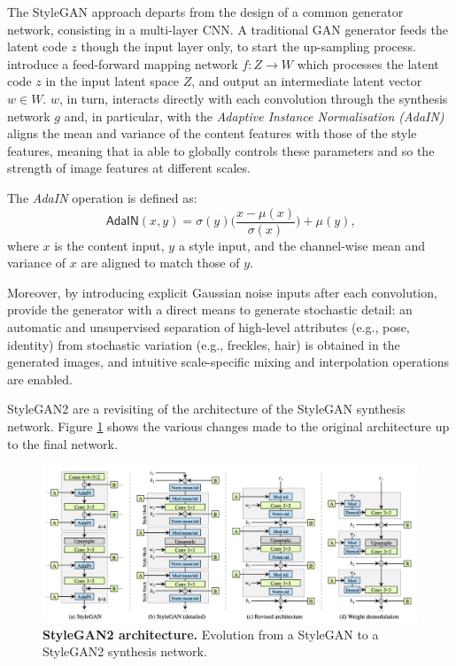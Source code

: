 \documentclass{article}
\begin{document}
	The StyleGAN approach departs from the design of a common generator network, consisting in a 
	multi-layer CNN.
	A traditional GAN generator feeds the latent code $z$ though the input layer only, to start the 
	up-sampling process.
	\citet{karras2019style} introduce a feed-forward mapping network $f : Z \rightarrow W$ which 
	processes the latent code $z$ in the input latent space $Z$, and output an intermediate latent 
	vector $w \in W$. 
	$w$, in turn, interacts directly with each convolution through the synthesis network  $g$ and, in 
	particular, with the \textit{Adaptive Instance Normalisation (AdaIN)} \cite{huang2017arbitrary} aligns 
	the mean and variance of the content features with those of the style features, meaning that ia able 
	to globally controls these parameters and so the strength of image features at different scales. 
	
	The \textit{AdaIN} operation is defined as:
	\begin{equation}
		\label{e:adain}
		\mathsf{AdaIN}(x, y) = \sigma(y) \bigg(\frac{x - \mu(x)}{\sigma (x)} \bigg) + \mu (y) \mbox{,}
	\end{equation}
	where $x$ is the content input, $y$ a style input, and the channel-wise mean and variance of $x$ 
	are aligned to match those of $y$.
	
	Moreover, by introducing explicit Gaussian noise inputs after each convolution, 
	\citet{karras2019style} provide the generator with a direct means to generate stochastic detail: an 
	automatic and unsupervised separation of high-level attributes (e.g., pose, identity) from stochastic 
	variation (e.g., freckles, hair) is obtained in the generated images, and intuitive scale-specific mixing 
	and interpolation operations are enabled.
	
	StyleGAN2 \cite{karras2020analyzing} are a revisiting of the architecture of the StyleGAN synthesis 
	network. Figure \ref{fig:styleGAN2} shows the various changes made to the original architecture up 
	to the final network.
	\begin{figure}[htb]				
		\centering
		\includegraphics[width=\linewidth]{images/styleGAN2}
		\caption{\textbf{StyleGAN2 architecture.} Evolution from a StyleGAN to a StyleGAN2 synthesis 
			network.}
		\label{fig:styleGAN2}
	\end{figure}
	
\end{document}
